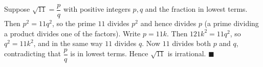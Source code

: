 Suppose $\sqrt{11}=\dfrac {p}{q}$ with positive integers $p,q$ and the fraction in lowest terms. Then $p^2=11q^2$, so the prime $11$ divides $p^2$ and hence divides $p$ (a prime dividing a product divides one of the factors). Write $p=11k$. Then $121k^2=11q^2$, so $q^2=11k^2$, and in the same way $11$ divides $q$. Now $11$ divides both $p$ and $q$, contradicting that $\dfrac {p}{q}$ is in lowest terms. Hence $\sqrt{11}$ is irrational. $\blacksquare$
